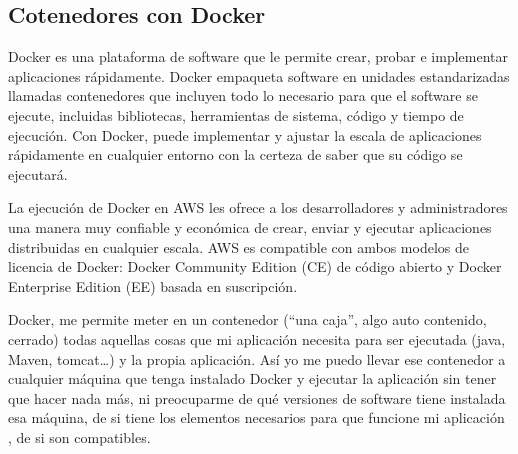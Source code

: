 \documentclass[twoside,twocolumn]{article}
\begin{document}
\begin{flushright}
\begin{itemize}
\subsection{Cotenedores con Docker}
Docker es una plataforma de software que le permite crear, probar e implementar aplicaciones rápidamente. Docker empaqueta software en unidades estandarizadas llamadas contenedores que incluyen todo lo necesario para que el software se ejecute, incluidas bibliotecas, herramientas de sistema, código y tiempo de ejecución. Con Docker, puede implementar y ajustar la escala de aplicaciones rápidamente en cualquier entorno con la certeza de saber que su código se ejecutará.

La ejecución de Docker en AWS les ofrece a los desarrolladores y administradores una manera muy confiable y económica de crear, enviar y ejecutar aplicaciones distribuidas en cualquier escala. AWS es compatible con ambos modelos de licencia de Docker: Docker Community Edition (CE) de código abierto y Docker Enterprise Edition (EE) basada en suscripción.

Docker, me permite meter en un contenedor (“una caja”, algo auto contenido, cerrado) todas aquellas cosas que mi aplicación necesita para ser ejecutada (java, Maven, tomcat…) y la propia aplicación. Así yo me puedo llevar ese contenedor a cualquier máquina que tenga instalado Docker y ejecutar la aplicación sin tener que hacer nada más, ni preocuparme de qué versiones de software tiene instalada esa máquina, de si tiene los elementos necesarios para que funcione mi aplicación , de si son compatibles.


\end{itemize}
\end{flushright}
\end{document}
